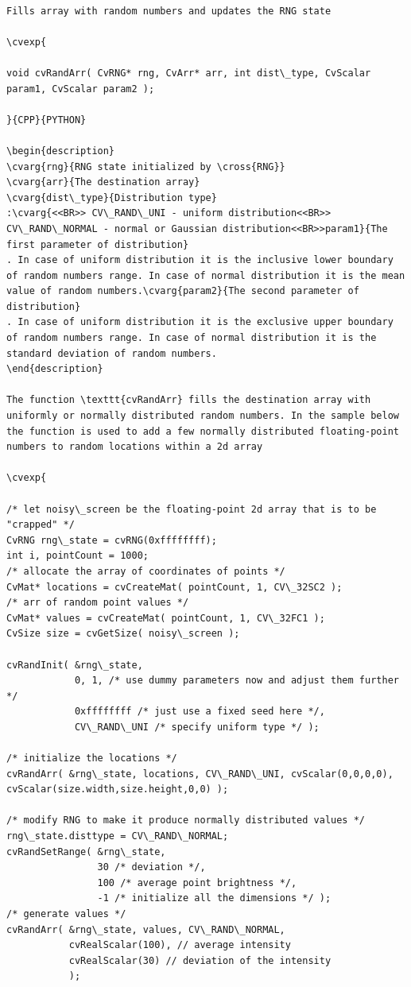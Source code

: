 \begin{verbatim}

Fills array with random numbers and updates the RNG state

\cvexp{

void cvRandArr( CvRNG* rng, CvArr* arr, int dist\_type, CvScalar param1, CvScalar param2 );

}{CPP}{PYTHON}

\begin{description}
\cvarg{rng}{RNG state initialized by \cross{RNG}}
\cvarg{arr}{The destination array}
\cvarg{dist\_type}{Distribution type}
:\cvarg{<<BR>> CV\_RAND\_UNI - uniform distribution<<BR>> CV\_RAND\_NORMAL - normal or Gaussian distribution<<BR>>param1}{The first parameter of distribution}
. In case of uniform distribution it is the inclusive lower boundary of random numbers range. In case of normal distribution it is the mean value of random numbers.\cvarg{param2}{The second parameter of distribution}
. In case of uniform distribution it is the exclusive upper boundary of random numbers range. In case of normal distribution it is the standard deviation of random numbers.
\end{description}

The function \texttt{cvRandArr} fills the destination array with uniformly or normally distributed random numbers. In the sample below the function is used to add a few normally distributed floating-point numbers to random locations within a 2d array

\cvexp{

/* let noisy\_screen be the floating-point 2d array that is to be "crapped" */
CvRNG rng\_state = cvRNG(0xffffffff);
int i, pointCount = 1000;
/* allocate the array of coordinates of points */
CvMat* locations = cvCreateMat( pointCount, 1, CV\_32SC2 );
/* arr of random point values */
CvMat* values = cvCreateMat( pointCount, 1, CV\_32FC1 );
CvSize size = cvGetSize( noisy\_screen );

cvRandInit( &rng\_state,
            0, 1, /* use dummy parameters now and adjust them further */
            0xffffffff /* just use a fixed seed here */,
            CV\_RAND\_UNI /* specify uniform type */ );

/* initialize the locations */
cvRandArr( &rng\_state, locations, CV\_RAND\_UNI, cvScalar(0,0,0,0), cvScalar(size.width,size.height,0,0) );

/* modify RNG to make it produce normally distributed values */
rng\_state.disttype = CV\_RAND\_NORMAL;
cvRandSetRange( &rng\_state,
                30 /* deviation */,
                100 /* average point brightness */,
                -1 /* initialize all the dimensions */ );
/* generate values */
cvRandArr( &rng\_state, values, CV\_RAND\_NORMAL,
           cvRealScalar(100), // average intensity
           cvRealScalar(30) // deviation of the intensity
           );


\end{verbatim}
